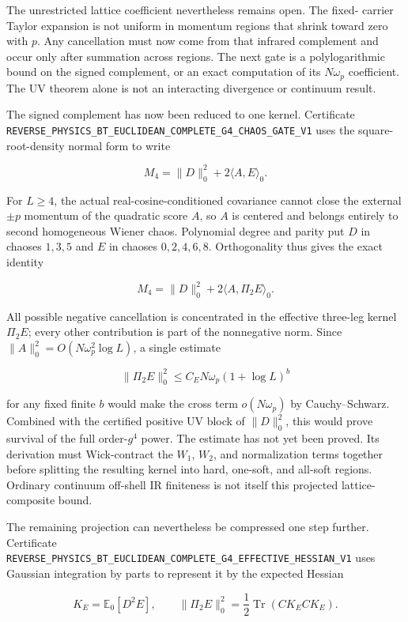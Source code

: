 \documentclass[11pt]{article}
\theoremstyle{definition}
\theoremstyle{remark}
\newcommand{\cert}[1]{\nolinkurl{#1}}
\begin{document}
The unrestricted lattice coefficient nevertheless remains open.  The fixed-
carrier Taylor expansion is not uniform in momentum regions that shrink
toward zero with $p$.  Any cancellation must now come from that infrared
complement and occur only after summation across regions.  The next gate is a
polylogarithmic bound on the signed complement, or an exact computation of its
$N\omega_p$ coefficient.  The UV theorem alone is not an interacting
divergence or continuum result.

The signed complement has now been reduced to one kernel.  Certificate
\cert{REVERSE_PHYSICS_BT_EUCLIDEAN_COMPLETE_G4_CHAOS_GATE_V1}
uses the square-root-density normal form to write

\[
 M_4=\|D\|_0^2+2\langle A,E\rangle_0.
\]

For $L\geq4$, the actual real-cosine-conditioned covariance cannot close the
external $\pm p$ momentum of the quadratic score $A$, so $A$ is centered and
belongs entirely to second homogeneous Wiener chaos.  Polynomial degree and
parity put
$D$ in chaoses $1,3,5$ and $E$ in chaoses $0,2,4,6,8$.  Orthogonality thus
gives the exact identity

\[
 M_4=\|D\|_0^2+2\langle A,\Pi_2E\rangle_0.
\]

All possible negative cancellation is concentrated in the effective
three-leg kernel $\Pi_2E$; every other contribution is part of the
nonnegative norm.  Since
$\|A\|_0^2=O(N\omega_p^2\log L)$, a single estimate

\[
 \|\Pi_2E\|_0^2
 \leq C_EN\omega_p(1+\log L)^b
\]

for any fixed finite $b$ would make the cross term $o(N\omega_p)$ by
Cauchy--Schwarz.  Combined with the certified positive UV block of
$\|D\|_0^2$, this would prove survival of the full order-$g^4$ power.  The
estimate has not yet been proved.  Its derivation must Wick-contract the
$W_1$, $W_2$, and normalization terms together before splitting the resulting
kernel into hard, one-soft, and all-soft regions.  Ordinary continuum
off-shell IR finiteness is not itself this projected lattice-composite bound.

The remaining projection can nevertheless be compressed one step further.
Certificate
\cert{REVERSE_PHYSICS_BT_EUCLIDEAN_COMPLETE_G4_EFFECTIVE_HESSIAN_V1}
uses Gaussian integration by parts to represent it by the expected Hessian

\[
 K_E=\mathbb E_0[D^2E],
 \qquad
 \|\Pi_2E\|_0^2=\frac12\operatorname{Tr}(C K_E C K_E).
\]
\end{document}
